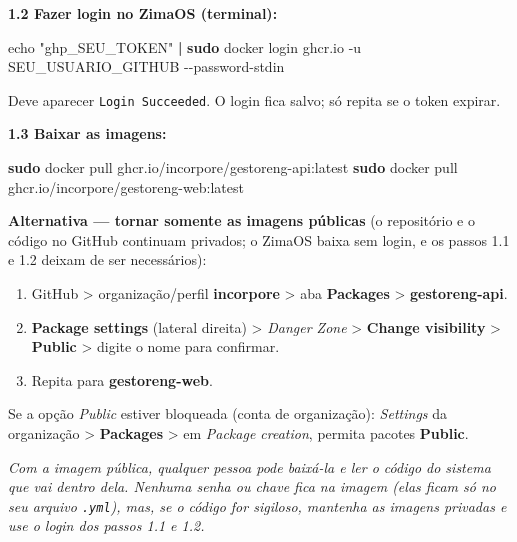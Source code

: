 \documentclass[
  10pt,
]{article}
\newenvironment{Shaded}{\begin{snugshade}}{\end{snugshade}}
\newcommand{\AttributeTok}[1]{\textcolor[rgb]{0.13,0.29,0.53}{#1}}
\newcommand{\BuiltInTok}[1]{#1}
\newcommand{\FunctionTok}[1]{\textcolor[rgb]{0.13,0.29,0.53}{\textbf{#1}}}
\newcommand{\KeywordTok}[1]{\textcolor[rgb]{0.13,0.29,0.53}{\textbf{#1}}}
\newcommand{\NormalTok}[1]{#1}
\newcommand{\StringTok}[1]{\textcolor[rgb]{0.31,0.60,0.02}{#1}}
\providecommand{\tightlist}{%
  \setlength{\itemsep}{0pt}\setlength{\parskip}{0pt}}
\renewenvironment{quote}{\begin{oldquote}\small\itshape}{\end{oldquote}}
\begin{document}
\textbf{1.2 Fazer login no ZimaOS (terminal):}

\begin{Shaded}
\begin{Highlighting}[]
\BuiltInTok{echo} \StringTok{"ghp\_SEU\_TOKEN"} \KeywordTok{|} \FunctionTok{sudo}\NormalTok{ docker login ghcr.io }\AttributeTok{{-}u}\NormalTok{ SEU\_USUARIO\_GITHUB }\AttributeTok{{-}{-}password{-}stdin}
\end{Highlighting}
\end{Shaded}

Deve aparecer \texttt{Login\ Succeeded}. O login fica salvo; só repita
se o token expirar.

\textbf{1.3 Baixar as imagens:}

\begin{Shaded}
\begin{Highlighting}[]
\FunctionTok{sudo}\NormalTok{ docker pull ghcr.io/incorpore/gestoreng{-}api:latest}
\FunctionTok{sudo}\NormalTok{ docker pull ghcr.io/incorpore/gestoreng{-}web:latest}
\end{Highlighting}
\end{Shaded}

\textbf{Alternativa --- tornar somente as imagens públicas} (o
repositório e o código no GitHub continuam privados; o ZimaOS baixa sem
login, e os passos 1.1 e 1.2 deixam de ser necessários):

\begin{enumerate}
\def\labelenumi{\arabic{enumi}.}
\tightlist
\item
  GitHub \textgreater{} organização/perfil \textbf{incorpore}
  \textgreater{} aba \textbf{Packages} \textgreater{}
  \textbf{gestoreng-api}.
\item
  \textbf{Package settings} (lateral direita) \textgreater{}
  \emph{Danger Zone} \textgreater{} \textbf{Change visibility}
  \textgreater{} \textbf{Public} \textgreater{} digite o nome para
  confirmar.
\item
  Repita para \textbf{gestoreng-web}.
\end{enumerate}

Se a opção \emph{Public} estiver bloqueada (conta de organização):
\emph{Settings} da organização \textgreater{} \textbf{Packages}
\textgreater{} em \emph{Package creation}, permita pacotes
\textbf{Public}.

\begin{quote}
Com a imagem pública, qualquer pessoa pode baixá-la e ler o código do
sistema que vai dentro dela. Nenhuma senha ou chave fica na imagem (elas
ficam só no seu arquivo \texttt{.yml}), mas, se o código for sigiloso,
mantenha as imagens privadas e use o login dos passos 1.1 e 1.2.
\end{quote}
\end{document}

